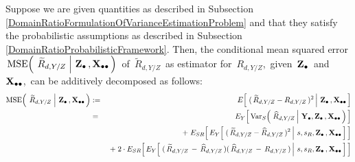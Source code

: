 \vskip 0.1cm
\begin{lemma}
\label{DomainRatioDecompositionMSETtilde}
\mbox{}
\vskip 0.1cm
\noindent
Suppose we are given quantities as described in Subsection
\ref{DomainRatioFormulationOfVarianceEstimationProblem}
and
that they satisfy the probabilistic assumptions as described in Subsection
\ref{DomainRatioProbabilisticFramework}.
Then, the conditional mean squared error
\,$
\textnormal{MSE}\!\left(\;
    \left.
    \widetilde{R}_{d,Y/Z}
    \;\right\vert\,
    \mathbf{Z}_{\bullet}\,,\mathbf{X}_{\bullet\bullet}
    \,\right)
$\,
of \,$\widetilde{R}_{d,Y/Z}$\,
as estimator for
\,$R_{d,Y/Z}$,\,
given \,$\mathbf{Z}_{\bullet}$\, and \,$\mathbf{X}_{\bullet\bullet}$,\,
can be additively decomposed as follows:
\begin{eqnarray*}
\MSE\!\left(\;
    \left.
    \widetilde{R}_{d,Y/Z}
    \;\right\vert\,
    \Zdot\,,\Xobs
    \,\right)
& := &
    E\!\left[\,
        \left.
        (\,\widetilde{R}_{d,Y/Z} - R_{d,Y/Z}\,)^{2}
        \,\right\vert\,
        \Zdot\,,\Xobs
        \,\right]
\\
& = &
    E_{Y}\!\left[\,
    \Var_{S}\!\left(\,
        \left.
        \widehat{R}_{d,Y/Z}
        \,\right\vert\,
        \Ydot,
        \Zdot\,,\Xobs
        \,\right)
        \,\right]
\\
&&
    \;+\;
    E_{SR}\!\left[\,
    E_{Y}\!\left[\,
        \left.
        (\,\widetilde{R}_{d,Y/Z} - \widehat{R}_{d,Y/Z}\,)^{2}
        \,\right\vert\,
        s,s_{R},\Zdot\,,\Xobs
        \,\right]
        \,\right]
\\
&&
    \;+\;
    2\cdot
    E_{SR}\!\left[\,
    E_{Y}\!\left[\,
        \left.
        (\,\widetilde{R}_{d,Y/Z} \,-\, \widehat{R}_{d,Y/Z}\,)(\,\widehat{R}_{d,Y/Z} \,-\, R_{d,Y/Z}\,)
        \,\right\vert\,
        s,s_{R},\Zdot\,,\Xobs
        \,\right]
        \,\right]
\end{eqnarray*}
\end{lemma}
\proof
